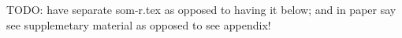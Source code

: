 \documentclass[10pt, letterpaper]{article}
\begin{document}
\begin{spacing}{1.4}
TODO: have separate som-r.tex as opposed to having it below; and in paper say
see supplemetary material as opposed to see appendix!










\end{spacing}
\end{document}
